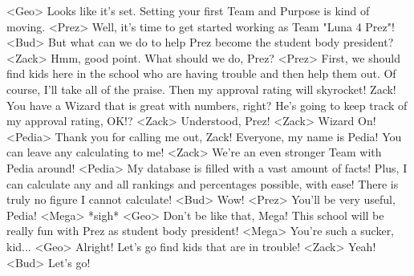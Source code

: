 <Geo> Looks like it's set. 
Setting your first Team and Purpose is kind of moving. 
<Prez> Well, it's time to get started working as Team "Luna 4 Prez"! 
<Bud> But what can we do to help Prez become the student body president? 
<Zack> Hmm, good point. What should we do, Prez? 
<Prez> First, we should find kids here in the school who 
are having trouble and then help them out. 
Of course, I'll take all of the praise. 
Then my approval rating will skyrocket! 
Zack! 
You have a Wizard that is great with numbers, right? 
He's going to keep track of my approval rating, OK!? 
<Zack> Understood, Prez! 
<Zack> Wizard On! 
<Pedia> Thank you for calling me out, Zack! 
Everyone, my name is Pedia! You can leave any calculating to me! 
<Zack> We're an even stronger Team with Pedia around! 
<Pedia> My database is filled with a vast amount of facts! 
Plus, I can calculate any and all rankings and 
percentages possible, with ease! 
There is truly no figure I cannot calculate! 
<Bud> Wow! 
<Prez> You'll be very useful, Pedia! 
<Mega> *sigh* 
<Geo> Don't be like that, Mega! 
This school will be really fun with Prez as student body president! 
<Mega> You're such a sucker, kid... 
<Geo> Alright! Let's go find kids that are in trouble! 
<Zack> Yeah! 
<Bud> Let's go! 
